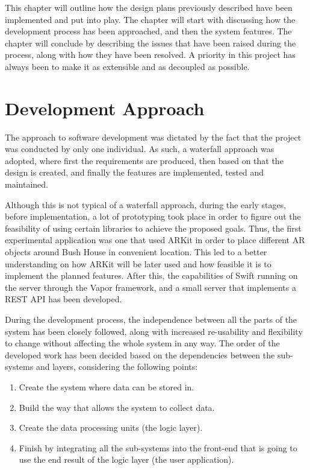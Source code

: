 This chapter will outline how the design plans previously described have been implemented and put into play. The chapter will start with discussing how the development process has been approached, and then the system features. The chapter will conclude by describing the issues that have been raised during the process, along with how they have been resolved. A priority in this project has always been to make it as extensible and as decoupled as possible.

\section{Development Approach}
The approach to software development was dictated by the fact that the project was conducted by only one individual. As such, a waterfall approach was adopted, where first the requirements are produced, then based on that the design is created, and finally the features are implemented, tested and maintained. 

Although this is not typical of a waterfall approach, during the early stages, before implementation, a lot of prototyping took place in order to figure out the feasibility of using certain libraries to achieve the proposed goals. Thus, the first experimental application was one that used ARKit in order to place different AR objects around Bush House in convenient location. This led to a better understanding on how ARKit will be later used and how feasible it is to implement the planned features. After this, the capabilities of Swift running on the server through the Vapor framework, and a small server that implements a REST API has been developed.

During the development process, the independence between all the parts of the system has been closely followed, along with increased re-usability and flexibility to change without affecting the whole system in any way. The order of the developed work has been decided based on the dependencies between the sub-systems and layers, considering the following points:
\begin{enumerate}
    \item Create the system where data can be stored in.
    \item Build the way that allows the system to collect data.
    \item Create the data processing units (the logic layer).
    \item Finish by integrating all the sub-systems into the front-end that is going to use the end result of the logic layer (the user application).
\end{enumerate}

